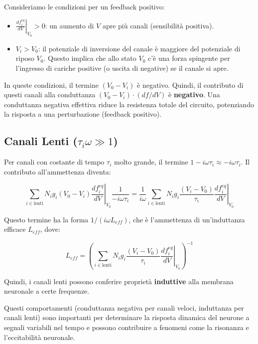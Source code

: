 Consideriamo le condizioni per un feedback positivo:
\begin{itemize}
    \item $\left.\frac{df_{i}^{eq}}{dV}\right|_{V_{0}} > 0$: un aumento di $V$ apre più canali (sensibilità positiva).
    \item $V_i > V_0$: il potenziale di inversione del canale è maggiore del potenziale di riposo $V_0$. Questo implica che allo stato $V_0$ c'è una forza spingente per l'ingresso di cariche positive (o uscita di negative) se il canale si apre.
\end{itemize}

In queste condizioni, il termine $(V_0 - V_i)$ è negativo. Quindi, il contributo di questi canali alla conduttanza $(V_0-V_i) \cdot (df/dV)$ è \textbf{negativo}. Una conduttanza negativa effettiva riduce la resistenza totale del circuito, potenziando la risposta a una perturbazione (feedback positivo).

\subsection*{Canali Lenti ($\tau_i \omega \gg 1$)}
Per canali con costante di tempo $\tau_i$ molto grande, il termine $1-i\omega\tau_i \approx -i\omega\tau_i$.
Il contributo all'ammettenza diventa:

\begin{equation} \label{eq:ch20_22}
\sum_{i \in \text{lenti}} N_ig_{i}(V_{0}-V_{i})\left.\frac{df_{i}^{eq}}{dV}\right|_{V_{0}} \frac{1}{-i\omega\tau_i} = \frac{1}{i\omega} \sum_{i \in \text{lenti}} N_ig_{i}\frac{(V_{i}-V_{0})}{\tau_{i}}\left.\frac{df_{i}^{eq}}{dV}\right|_{V_{0}}
\end{equation}

Questo termine ha la forma $1/(i\omega L_{eff})$, che è l'ammettenza di un'induttanza efficace $L_{eff}$, dove:

\begin{equation} \label{eq:ch20_23}
L_{eff} = \left( \sum_{i \in \text{lenti}} N_ig_{i}\frac{(V_{i}-V_{0})}{\tau_{i}}\left.\frac{df_{i}^{eq}}{dV}\right|_{V_{0}} \right)^{-1}
\end{equation}

Quindi, i canali lenti possono conferire proprietà \textbf{induttive} alla membrana neuronale a certe frequenze.

Questi comportamenti (conduttanza negativa per canali veloci, induttanza per canali lenti) sono importanti per determinare la risposta dinamica del neurone a segnali variabili nel tempo e possono contribuire a fenomeni come la risonanza e l'eccitabilità neuronale.
